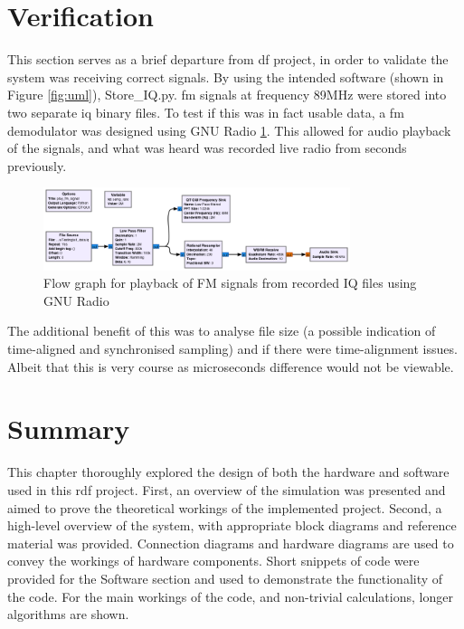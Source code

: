 \documentclass[class=report,11pt,crop=false]{standalone}
\begin{document}

\section{Verification}\label{sec:Design/verification}
This section serves as a brief departure from \gls{df} project, in order to validate the system was receiving correct signals. By using the intended software (shown in Figure \ref{fig:uml}), Store\_IQ.py. \gls{fm} signals at frequency 89MHz were stored into two separate \gls{iq} binary files. To test if this was in fact usable data, a \gls{fm} demodulator was designed using GNU Radio \ref{fig:fm-demod}. This allowed for audio playback of the signals, and what was heard was recorded live radio from seconds previously. 

\begin{figure}[h]
    \centering
    \includegraphics[width=0.8\textwidth]{Images/diagrams/play_fm_signal.png}
    \caption{Flow graph for playback of FM signals from recorded IQ files using GNU Radio}
    \label{fig:fm-demod}
\end{figure}
The additional benefit of this was to analyse file size (a possible indication of time-aligned and synchronised sampling) and if there were time-alignment issues. Albeit that this is very course as microseconds difference would not be viewable. 

\newpage


\section{Summary}
This chapter thoroughly explored the design of both the hardware and software used in this \gls{rdf} project. First, an overview of the simulation was presented and aimed to prove the theoretical workings of the implemented project. Second, a high-level overview of the system, with appropriate block diagrams and reference material was provided. Connection diagrams and hardware diagrams are used to convey the workings of hardware components. Short snippets of code were provided for the Software section and used to demonstrate the functionality of the code. For the main workings of the code, and non-trivial calculations, longer algorithms are shown. 

\ifstandalone

\printnoidxglossary[type=\acronymtype,nonumberlist]
\fi
\end{document}

